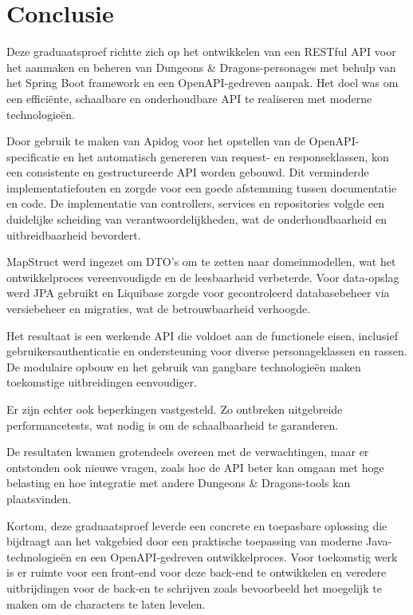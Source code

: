 
\chapter{Conclusie}%
\label{ch:conclusie}


Deze graduaatsproef richtte zich op het ontwikkelen van een RESTful API voor het aanmaken en beheren van Dungeons \& Dragons-personages met behulp van het Spring Boot framework en een OpenAPI-gedreven aanpak. Het doel was om een efficiënte, schaalbare en onderhoudbare API te realiseren met moderne technologieën.

Door gebruik te maken van Apidog voor het opstellen van de OpenAPI-specificatie en het automatisch genereren van request- en responseklassen, kon een consistente en gestructureerde API worden gebouwd. Dit verminderde implementatiefouten en zorgde voor een goede afstemming tussen documentatie en code. De implementatie van controllers, services en repositories volgde een duidelijke scheiding van verantwoordelijkheden, wat de onderhoudbaarheid en uitbreidbaarheid bevordert.

MapStruct werd ingezet om DTO’s om te zetten naar domeinmodellen, wat het ontwikkelproces vereenvoudigde en de leesbaarheid verbeterde. Voor data-opslag werd JPA gebruikt en Liquibase zorgde voor gecontroleerd databasebeheer via versiebeheer en migraties, wat de betrouwbaarheid verhoogde.

Het resultaat is een werkende API die voldoet aan de functionele eisen, inclusief gebruikersauthenticatie en ondersteuning voor diverse personageklassen en rassen. De modulaire opbouw en het gebruik van gangbare technologieën maken toekomstige uitbreidingen eenvoudiger.

Er zijn echter ook beperkingen vastgesteld. Zo ontbreken uitgebreide performancetests, wat nodig is om de schaalbaarheid te garanderen.

De resultaten kwamen grotendeels overeen met de verwachtingen, maar er ontstonden ook nieuwe vragen, zoals hoe de API beter kan omgaan met hoge belasting en hoe integratie met andere Dungeons \& Dragons-tools kan plaatsvinden.

Kortom, deze graduaatsproef leverde een concrete en toepasbare oplossing die bijdraagt aan het vakgebied door een praktische toepassing van moderne Java-technologieën en een OpenAPI-gedreven ontwikkelproces. Voor toekomstig werk is er ruimte voor een front-end voor deze back-end te ontwikkelen en veredere uitbrijdingen voor de back-en te schrijven zoals bevoorbeeld het moegelijk te maken om de characters te laten levelen.

